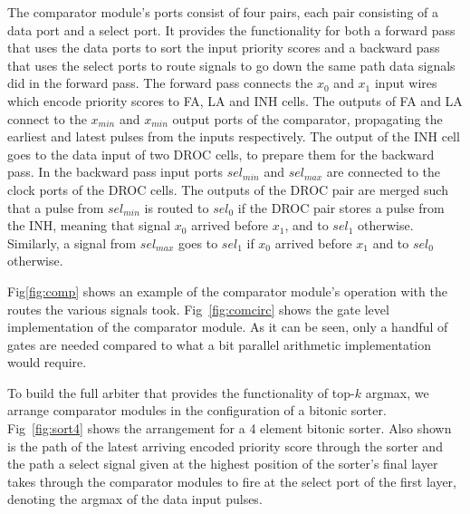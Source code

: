 \documentclass[conference]{IEEEtran}
\begin{document}
The comparator module's ports consist of four pairs, each pair consisting of a data port and a select port.
It provides the functionality for both a forward pass that uses the data ports to sort the input priority scores and a backward pass that uses the select ports to route signals to go down the same path data signals did in the forward pass.
The forward pass connects the $x_0$ and $x_1$ input wires which encode priority scores to FA, LA and INH cells.
The outputs of FA and LA connect to the $x_{min}$ and $x_{min}$ output ports of the comparator, propagating the earliest and latest pulses from the inputs respectively.
The output of the INH cell goes to the data input of two DROC cells, to prepare them for the backward pass.
In the backward pass input ports $sel_{min}$ and $sel_{max}$ are connected to the clock ports of the DROC cells.
The outputs of the DROC pair are merged such that a pulse from $sel_{min}$ is routed to $sel_0$ if the DROC pair stores a pulse from the INH, meaning that signal $x_0$ arrived before $x_1$, and to $sel_1$ otherwise.
Similarly, a signal from $sel_{max}$ goes to $sel_1$ if $x_0$ arrived before $x_1$ and to $sel_0$ otherwise.

Fig\ref{fig:comp} shows an example of the comparator module's operation with the routes the 
various signals took.
Fig~\ref{fig:comcirc} shows the gate level implementation of the comparator module.
As it can be seen, only a handful of gates are needed compared to what a bit parallel arithmetic implementation would require.

To build the full arbiter that provides the functionality of top-$k$ argmax, we arrange comparator modules in the configuration of a bitonic sorter.
Fig~\ref{fig:sort4} shows the arrangement for a 4 element bitonic sorter.
Also shown is the path of the latest arriving encoded priority score through the sorter and the path a select signal given at the highest position of the sorter's final layer takes through the comparator modules to fire at the select port of the first layer, denoting the argmax of the data input pulses.
\end{document}
